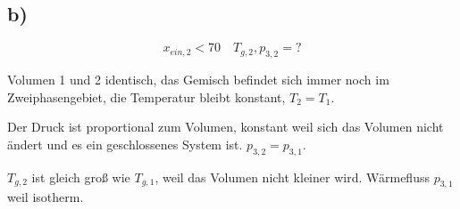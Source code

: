 

\subsection*{b)}

\[
x_{ein,2} < 70 \quad T_{g,2}, p_{3,2} = ?
\]

Volumen 1 und 2 identisch, das Gemisch befindet sich immer noch im Zweiphasengebiet, die Temperatur bleibt konstant, \( T_2 = T_1 \).

Der Druck ist proportional zum Volumen, konstant weil sich das Volumen nicht ändert und es ein geschlossenes System ist. \( p_{3,2} = p_{3,1} \).

\( T_{g,2} \) ist gleich groß wie \( T_{g,1} \), weil das Volumen nicht kleiner wird. Wärmefluss \( p_{3,1} \) weil isotherm.